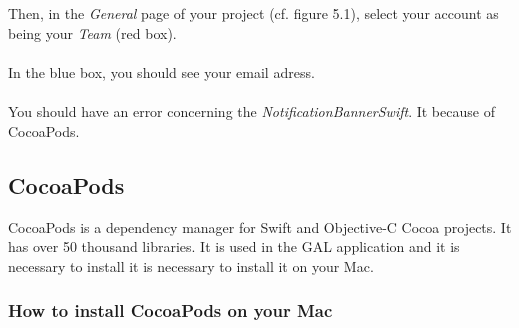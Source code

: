 \\\\
Then, in the \textit{General} page of your project (cf. figure 5.1), select your account as being your \textit{Team} (red box).
\\\\
In the blue box, you should see your email adress.
\\\\
You should have an error concerning the \textit{NotificationBannerSwift}. It because of CocoaPods.

\subsection{CocoaPods}

CocoaPods is a dependency manager for Swift and Objective-C Cocoa projects. It has over 50 thousand libraries. It is used in the GAL application and it is necessary to install it is necessary to install it on your Mac.

\subsubsection{How to install CocoaPods on your Mac}

